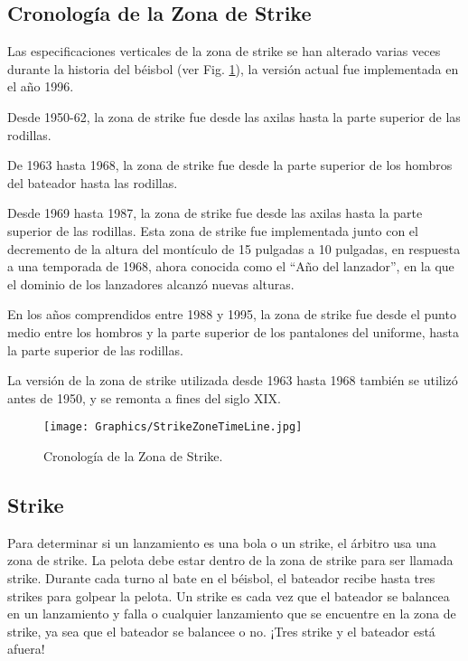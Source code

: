 \subsection{Cronología de la Zona de Strike}

Las especificaciones verticales de la zona de strike se han alterado varias veces durante la historia del béisbol (ver Fig. \ref{fig:StrikeZoneTimeLine}), la versión actual fue implementada en el año 1996.

Desde 1950-62, la zona de strike fue desde las axilas hasta la parte superior de las rodillas.

De 1963 hasta 1968, la zona de strike fue desde la parte superior de los hombros del bateador hasta las rodillas.

Desde 1969 hasta 1987, la zona de strike fue desde las axilas hasta la parte superior de las rodillas. Esta zona de strike fue implementada junto con el decremento de la altura del montículo de 15 pulgadas a 10 pulgadas, en respuesta a una temporada de 1968, ahora conocida como el ``Año del lanzador'', en la que el dominio de los lanzadores alcanzó nuevas alturas.

En los años comprendidos entre 1988 y 1995, la zona de strike fue desde el punto medio entre los hombros y la parte superior de los pantalones del uniforme, hasta la parte superior de las rodillas.

La versión de la zona de strike utilizada desde 1963 hasta 1968 también se utilizó antes de 1950, y se remonta a fines del siglo XIX.

\begin{figure}[!h]
    \centering
    \texttt{[image: Graphics/StrikeZoneTimeLine.jpg]}
    \caption{Cronología de la Zona de Strike.}
    \label{fig:StrikeZoneTimeLine}
\end{figure}

\subsection{Strike}

Para determinar si un lanzamiento es una bola o un strike, el árbitro usa una zona de strike. La pelota debe estar dentro de la zona de strike para ser llamada strike. Durante cada turno al bate en el béisbol, el bateador recibe hasta tres strikes para golpear la pelota. Un strike es cada vez que el bateador se balancea en un lanzamiento y falla o cualquier lanzamiento que se encuentre en la zona de strike, ya sea que el bateador se balancee o no. ¡Tres strike y el bateador está afuera!

